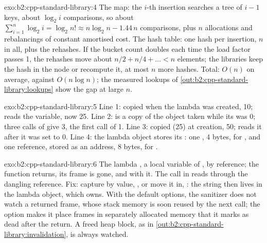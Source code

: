 \begin{solution}{exo:b2:cpp-standard-library:4}
The map: the $i$-th insertion searches a tree of $i - 1$ keys, about $\log_2 i$ comparisons, so about
$\sum_{i=1}^{n} \log_2 i = \log_2 n! \approx n \log_2 n - 1.44\,n$ comparisons, plus $n$ allocations and
rebalancings of constant amortised cost. The hash table: one hash per insertion, $n$ in all, plus the rehashes. If
the bucket count doubles each time the load factor passes 1, the rehashes move about
$n/2 + n/4 + \dots < n$ elements; the libraries keep the hash in the node or recompute it, at most $n$ more hashes.
Total: $O(n)$ on average, against $O(n \log n)$; the measured lookups of
\cref{out:b2:cpp-standard-library:lookups} show the gap at large $n$.
\end{solution}

\begin{solution}{exo:b2:cpp-standard-library:5}
Line 1:  copied  when the lambda was created, 10;  reads the variable, now
25. Line 2:  is a copy of the object  taken while its  was 0; three calls of
 give 3, the first call of  1. Line 3: \code{[=]} copied  (25) at creation, 50;
\code{[&]} reads it after it was set to 0. Line 4: the lambda object stores its : one , 4 bytes,
for , and one reference, stored as an address, 8 bytes, for .
\end{solution}

\begin{solution}{exo:b2:cpp-standard-library:6}
The lambda  , a local variable of , by reference; the function returns,
its frame is gone, and  with it. The call in  reads  through the dangling reference.
Fix: capture by value, \code{[p]}, or move it in, \code{[p = std::move(p)]}: the string then lives in the lambda
object, which  owns. With the default options, the sanitizer does not watch a returned frame,
whose stack memory is soon reused by the next call; the option makes it place frames in separately allocated
memory that it marks as dead after the return. A freed heap block, as in \cref{out:b2:cpp-standard-library:invalidation},
is always watched.
\end{solution}

